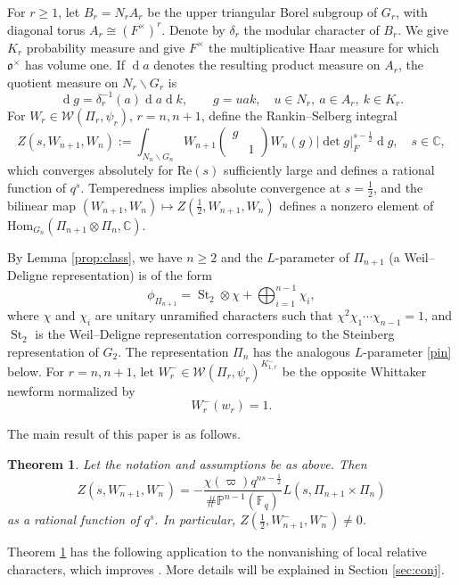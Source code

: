 \documentclass[11pt, a4paper]{amsart}
\newcommand{\CW}{{\mathcal {W}}}
\newcommand{\Hom}{{\mathrm{Hom}}}
\renewcommand{\Re}{{\mathrm{Re}}}
\newcommand{\bs}{\backslash}
\newcommand{\od}{\operatorname{d}}
\renewcommand{\o}{\mathfrak o}
\newcommand{\C}{\mathbb{C}}
\newcommand{\abs}[1]{\lvert#1\rvert}
\newcommand{\be}{\begin {equation}}
\newcommand{\ee}{\end {equation}}
\newcommand{\St}{\operatorname{St}}
\theoremstyle{plain}
\theoremstyle{plain}
\theoremstyle{plain}
\theoremstyle{plain}
\theoremstyle{remark}
\theoremstyle{definition}
\theoremstyle{plain}
\newtheorem{theorem}{Theorem}[section]
\numberwithin{equation}{section}
\begin{document}
For $r\geq 1$, let $B_r=N_rA_r$ be the upper triangular Borel subgroup
of $G_r$, with diagonal torus $A_r \cong (F^\times)^r$. Denote by $\delta_r$ the modular character of $B_r$.  We give $K_r$ probability measure and give $F^\times$ the
multiplicative Haar measure for which $\o^\times$ has volume one.  If
$\od\! a$ denotes the resulting product measure on $A_r$, the
quotient measure on $N_r\backslash G_r$ is
\[
\od\!  g= \delta_r^{-1}(a)\od \!a\od\!k,
\qquad g=uak,\quad u\in N_r,\ a\in A_r,\ k\in K_r.
\]
For $W_r\in\CW(\Pi_r,\psi_r)$, $r=n,n+1$, define the Rankin--Selberg integral
\cite{JPSS}
\be \label{RS}
Z(s, W_{n+1}, W_n):=\int_{N_n\bs G_n} W_{n+1}\begin{pmatrix} g  \\ & 1\end{pmatrix} W_n(g)\abs{\det g}_F^{s-\frac{1}{2}}\od\! g,\quad s\in \C,
\ee
which converges absolutely for $\Re(s)$ sufficiently large and defines a rational function of $q^s$.  Temperedness implies absolute
convergence at $s=\frac12$, and the bilinear map
$(W_{n+1},W_n)\mapsto Z(\frac12,W_{n+1},W_n)$ defines a nonzero element of
$\Hom_{G_n}(\Pi_{n+1}\otimes\Pi_n,\C)$.

By Lemma \ref{prop:class}, we have $n\geq2$ and the $L$-parameter of $\Pi_{n+1}$ (a Weil--Deligne representation) is of the form 
\be \label{pin+1}
\phi_{\Pi_{n+1}} = \St_2\otimes\chi  + \bigoplus^{n-1}_{i=1}\chi_i,
\ee
where $\chi$ and $\chi_i$ are  unitary unramified characters such that $\chi^2\chi_1\cdots\chi_{n-1}=1$, and $\St_2$ is the Weil--Deligne representation corresponding to the Steinberg
representation of $G_2$.  The representation $\Pi_n$ has the analogous $L$-parameter
\eqref{pin} below.  For $r=n,n+1$, let
$W_r^-\in\CW(\Pi_r,\psi_r)^{K_{1,r}^-}$ be the opposite Whittaker
newform normalized by
\[
W_r^-(w_r)=1.
\]

The main result of this paper is as follows. 

\begin{theorem}
\label{thm:main}
Let the notation and assumptions be as above.  Then
\[
 Z(s,W_{n+1}^-,W_n^-)
 =-\frac{\chi(\varpi) q^{ns- \frac{1}{2}}}{ \# \mathbb{P}^{n-1}(\mathbb{F}_q)}
L(s,\Pi_{n+1}\times\Pi_n)
\]
as a rational function of $q^s$. In particular, $Z(\frac{1}{2}, W_{n+1}^-, W_n^-)\neq 0$. 
\end{theorem}

Theorem \ref{thm:main} has the following application to the nonvanishing of local relative characters, which improves \cite[Theorem C]{DZ}. More details will be explained in Section \ref{sec:conj}.
\end{document}
